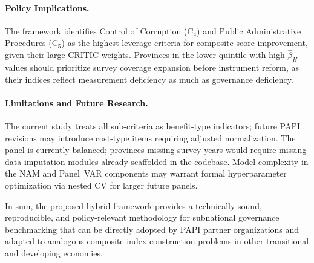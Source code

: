 \documentclass[12pt, a4paper]{article}
\begin{document}
\paragraph{Policy Implications.}
The framework identifies Control of Corruption ($\text{C}_4$) and Public
Administrative Procedures ($\text{C}_5$) as the highest-leverage criteria for
composite score improvement, given their large CRITIC weights. Provinces in the
lower quintile with high $\hat{\beta}_H$ values should prioritize survey
coverage expansion before instrument reform, as their indices reflect
measurement deficiency as much as governance deficiency.

\paragraph{Limitations and Future Research.}
The current study treats all sub-criteria as benefit-type indicators; future
PAPI revisions may introduce cost-type items requiring adjusted normalization.
The panel is currently balanced; provinces missing survey years would require
missing-data imputation modules already scaffolded in the codebase. Model
complexity in the NAM and Panel~VAR components may warrant formal hyperparameter
optimization via nested CV for larger future panels.

\bigskip\noindent
In sum, the proposed hybrid framework provides a technically sound, reproducible,
and policy-relevant methodology for subnational governance benchmarking that can
be directly adopted by PAPI partner organizations and adapted to analogous
composite index construction problems in other transitional and developing
economies.
\end{document}
